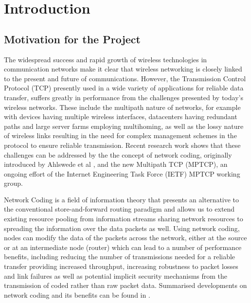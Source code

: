 \documentclass[12pt,a4paper,twoside,openright]{report}
\begin{document}

\pagestyle{headings}

\chapter{Introduction} \label{ch:intro}

\section{Motivation for the Project}

The widespread success and rapid growth of wireless technologies in communication networks make it clear that wireless networking is closely linked to the present and future of communications. However, the Transmission Control Protocol (TCP) presently used in a wide variety of applications for reliable data transfer, suffers greatly in performance from the challenges presented by today's wireless networks. These include the multipath nature of networks, for example with devices having multiple wireless interfaces, datacenters having redundant paths and large server farms employing multihoming, as well as the lossy nature of wireless links resulting in the need for complex management schemes in the protocol to ensure reliable transmission. Recent research work shows that these challenges can be addressed by the the concept of network coding, originally introduced by Ahlswede et al \cite{ahlswede}, and the new Multipath TCP (MPTCP)\cite{mptcp-ietf}, an ongoing effort of the Internet Engineering Task Force (IETF) MPTCP working group.

Network Coding is a field of information theory that presents an alternative to the conventional store-and-forward routing paradigm and allows us to extend existing resource pooling from information streams sharing network resources to spreading the information over the data packets as well. Using network coding, nodes can modify the data of the packets across the network, either at the source or at an intermediate node (router) which can lead to a number of performance benefits, including reducing the number of transmissions needed for a reliable transfer providing increased throughput, increasing robustness to packet losses and link failures as well as potential implicit security mechanisms from the transmission of coded rather than raw packet data. Summarised developments on network coding and its benefits can be found in \cite{nc-intro}.
\end{document}

